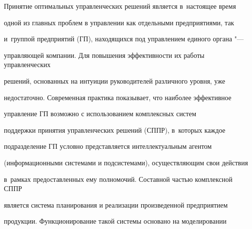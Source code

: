 


\date{16/VII/2009} %









\maketitle






Принятие оптимальных управленческих решений является в~настоящее время

одной из главных проблем в управлении как отдельными предприятиями, так

и~группой предприятий (ГП), находящихся под управлением единого органа "---

управляющей компании. Для повышения эффективности их работы управленческих

решений, основанных на интуиции руководителей различного уровня, уже

недостаточно. Современная практика показывает, что наиболее эффективное

управление ГП возможно с использованием комплексных систем

поддержки принятия управленческих решений (СППР), в~которых каждое

подразделение ГП условно представляется интеллектуальным агентом

(информационными системами и подсистемами), осуществляющим свои действия

в~рамках предоставленных ему полномочий. Составной частью комплексной СППР

является система планирования и реализации произведенной предприятием

продукции. Функционирование такой системы основано на моделировании

